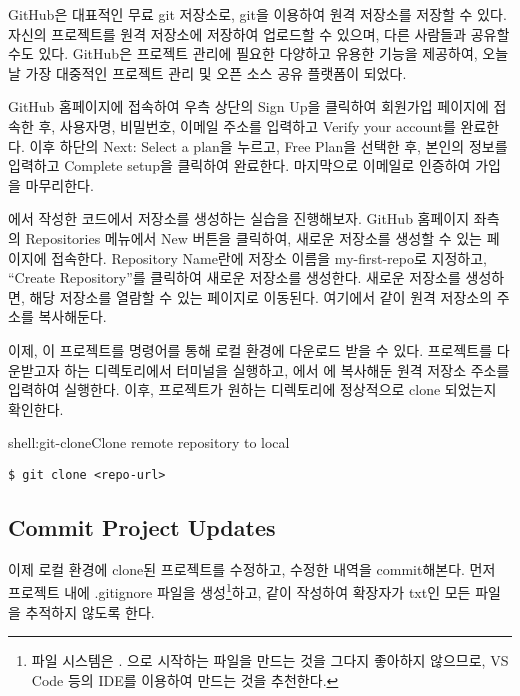 GitHub은 대표적인 무료 git 저장소로, git을 이용하여 원격 저장소를 저장할 수 있다. 자신의 프로젝트를 원격 저장소에 저장하여 업로드할 수 있으며, 다른 사람들과 공유할 수도 있다. GitHub은 프로젝트 관리에 필요한 다양하고 유용한 기능을 제공하여, 오늘날 가장 대중적인 프로젝트 관리 및 오픈 소스 공유 플랫폼이 되었다.

GitHub 홈페이지에 접속하여 우측 상단의 Sign Up을 클릭하여 회원가입 페이지에 접속한 후, 사용자명, 비밀번호, 이메일 주소를 입력하고 Verify your account를 완료한다. 이후 하단의 Next: Select a plan을 누르고, Free Plan을 선택한 후, 본인의 정보를 입력하고 Complete setup을 클릭하여 완료한다. 마지막으로 이메일로 인증하여 가입을 마무리한다.

에서 작성한 코드에서 저장소를 생성하는 실습을 진행해보자. GitHub 홈페이지 좌측의 Repositories 메뉴에서 New 버튼을 클릭하여, 새로운 저장소를 생성할 수 있는 페이지에 접속한다. Repository Name란에 저장소 이름을 my-first-repo로 지정하고, ``Create Repository''를 클릭하여 새로운 저장소를 생성한다. 새로운 저장소를 생성하면, 해당 저장소를 열람할 수 있는 페이지로 이동된다. 여기에서 \과 같이 원격 저장소의 주소를 복사해둔다.


이제, 이 프로젝트를  명령어를 통해 로컬 환경에 다운로드 받을 수 있다. 프로젝트를 다운받고자 하는 디렉토리에서 터미널을 실행하고, 에서 에 복사해둔 원격 저장소 주소를 입력하여 실행한다. 이후, 프로젝트가 원하는 디렉토리에 정상적으로 clone 되었는지 확인한다.

\begin{shellenv}{shell:git-clone}{Clone remote repository to local}\begin{verbatim}
$ git clone <repo-url>
\end{verbatim}
\end{shellenv}

\subsection*{Commit Project Updates}

이제 로컬 환경에 clone된 프로젝트를 수정하고, 수정한 내역을 commit해본다. 먼저 프로젝트 내에 .gitignore 파일을 생성\footnote{파일 시스템은 . 으로 시작하는 파일을 만드는 것을 그다지 좋아하지 않으므로, VS Code 등의 IDE를 이용하여 만드는 것을 추천한다.}하고, \과 같이 작성하여 확장자가 txt인 모든 파일을 추적하지 않도록 한다.

